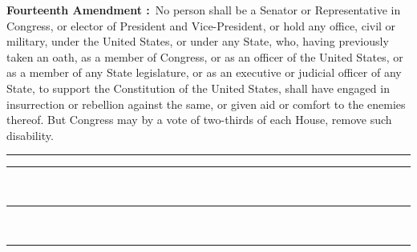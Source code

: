 \documentclass{article}
\begin{document}
\parbox[t][0.75\textheight][l]{\textwidth}{\fmmfamily \Large
	\textbf{Fourteenth Amendment :}\ 
	No person shall be a Senator or Representative in Congress, or
	elector of President and Vice-President, or hold any office, civil
	or military, under the United States, or under any State, who,
	having previously taken an oath, as a member of Congress, or as an
	officer of the United States, or as a member of any State
	legislature, or as an executive or judicial officer of any State, to
	support the Constitution of the United States, shall have engaged in
	insurrection or rebellion against the same, or given aid or comfort
	to the enemies thereof. But Congress may by a vote of two-thirds of
	each House, remove such disability.	}

\hfill{}
\eject

\newpage 

\begin{minipage}{0.5\textwidth}
\hspace{\textwidth}
\rule{.5pt}{\textheight}
\end{minipage}
\begin{minipage}{0.5\textwidth}
\vspace{24pt}
\noindent\hspace{12pt}\rule{5cm}{0.4pt}\\

\noindent\hspace{12pt}\rule{5cm}{0.4pt}\\

\noindent\hspace{12pt}\rule{5cm}{0.4pt}
\vfill
\end{minipage}
\end{document}
